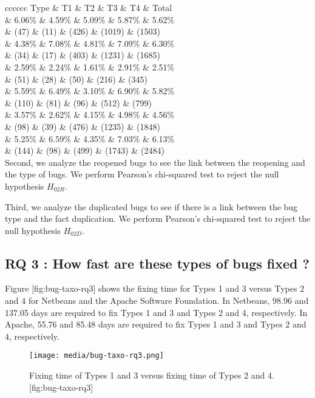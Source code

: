 {c\textbar{}c\textbar{}c\textbar{}c\textbar{}c\textbar{}c} Type \& T1 \&
T2 \& T3 \& T4 \& Total\\[2\baselineskip]\& 6.06\% \& 4.59\% \& 5.09\%
\& 5.87\% \& 5.62\%\\
\& (47) \& (11) \& (426) \& (1019) \& (1503)\\
\& 4.38\% \& 7.08\% \& 4.81\% \& 7.09\% \& 6.30\%\\
\& (34) \& (17) \& (403) \& (1231) \& (1685)\\[2\baselineskip]\& 2.59\%
\& 2.24\% \& 1.61\% \& 2.91\% \& 2.51\%\\
\& (51) \& (28) \& (50) \& (216) \& (345)\\
\& 5.59\% \& 6.49\% \& 3.10\% \& 6.90\% \& 5.82\%\\
\& (110) \& (81) \& (96) \& (512) \& (799)\\[2\baselineskip]\& 3.57\% \&
2.62\% \& 4.15\% \& 4.98\% \& 4.56\%\\
\& (98) \& (39) \& (476) \& (1235) \& (1848)\\
\& 5.25\% \& 6.59\% \& 4.35\% \& 7.03\% \& 6.13\%\\
\& (144) \& (98) \& (499) \& (1743) \& (2484)\\
Second, we analyze the reopened bugs to see the link between the
reopening and the type of bugs. We perform Pearson's chi-squared test to
reject the null hypothesis \(H_{02R}\).

Third, we analyze the duplicated bugs to see if there is a link between
the bug type and the fact duplication. We perform Pearson's chi-squared
test to reject the null hypothesis \(H_{02D}\).

\subsection{RQ 3 : How fast are these types of bugs fixed
?}\label{rq-3-how-fast-are-these-types-of-bugs-fixed-1}

Figure {[}fig:bug-taxo-rq3{]} shows the fixing time for Types 1 and 3
versus Types 2 and 4 for Netbeans and the Apache Software Foundation. In
Netbeans, 98.96 and 137.05 days are required to fix Types 1 and 3 and
Types 2 and 4, respectively. In Apache, 55.76 and 85.48 days are
required to fix Types 1 and 3 and Types 2 and 4, respectively.

\begin{figure}[htbp]
\centering
\texttt{[image: media/bug-taxo-rq3.png]}
\caption{Fixing time of Types 1 and 3 versus fixing time of Types 2 and
4. {[}fig:bug-taxo-rq3{]}}
\end{figure}

